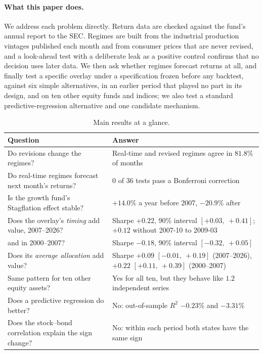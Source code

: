 \documentclass[11pt,a4paper]{article}
\begin{document}
\paragraph{What this paper does.} We address each problem directly. Return data are checked against the
fund's annual report to the SEC. Regimes are built from the industrial production vintages published each
month and from consumer prices that are never revised, and a look-ahead test with a deliberate leak as a
positive control confirms that no decision uses later data. We then ask whether regimes forecast returns at
all, and finally test a specific overlay under a specification frozen before any backtest, against six simple
alternatives, in an earlier period that played no part in its design, and on ten other equity funds and
indices; we also test a standard predictive-regression alternative and one candidate mechanism.

\begin{table}[htbp]
\centering
\caption{Main results at a glance.}
\label{tab:glance}
\small
\begin{tabular}{@{}p{}p{}@{}}
\toprule
Question & Answer \\
\midrule
Do revisions change the regimes? & Real-time and revised regimes agree in $81.8\%$ of months \\
Do real-time regimes forecast next month's returns? & 0 of 36 tests pass a Bonferroni correction \\
Is the growth fund's Stagflation effect stable? & $+14.0\%$ a year before 2007, $-20.9\%$ after \\
Does the overlay's \emph{timing} add value, 2007--2026? & Sharpe $+0.22$, 90\% interval $[+0.03,\ +0.41]$; $+0.12$ without 2007-10 to 2009-03 \\
\quad and in 2000--2007? & Sharpe $-0.18$, 90\% interval $[-0.32,\ +0.05]$ \\
Does its \emph{average allocation} add value? & Sharpe $+0.09$ $[-0.01,\ +0.19]$ (2007--2026), $+0.22$ $[+0.11,\ +0.39]$ (2000--2007) \\
Same pattern for ten other equity assets? & Yes for all ten, but they behave like $1.2$ independent series \\
Does a predictive regression do better? & No: out-of-sample $R^2$ $-0.23\%$ and $-3.31\%$ \\
Does the stock--bond correlation explain the sign change? & No: within each period both states have the same sign \\
\bottomrule
\end{tabular}
\end{table}
\end{document}
